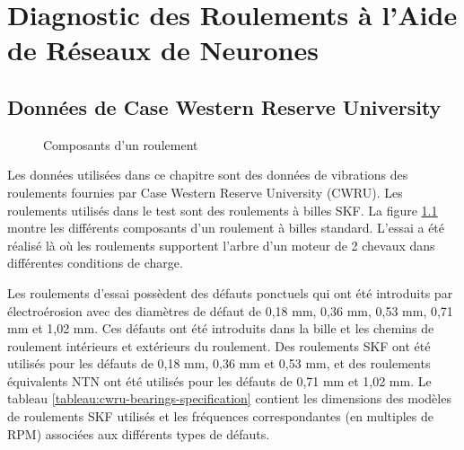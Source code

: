 \chapter{Diagnostic des Roulements à l'Aide de Réseaux de Neurones}


\section{Données de Case Western Reserve University}

\begin{figure}
    \centering
	
	\caption{Composants d'un roulement}
    \label{figure:skf-bearing-components}    
\end{figure}

Les données utilisées dans ce chapitre sont des données de vibrations des roulements fournies par Case Western Reserve University (CWRU). Les roulements utilisés dans le test sont des roulements à billes SKF. La figure \ref{figure:skf-bearing-components} montre les différents composants d'un roulement à billes standard. L'essai a été réalisé là où les roulements supportent l'arbre d'un moteur de 2 chevaux dans différentes conditions de charge. 

Les roulements d'essai possèdent des défauts ponctuels qui ont été introduits par électroérosion avec des diamètres de défaut de 0,18 mm, 0,36 mm, 0,53 mm, 0,71 mm et 1,02 mm. Ces défauts ont été introduits dans la bille et les chemins de roulement intérieurs et extérieurs du roulement. Des roulements SKF ont été utilisés pour les défauts de 0,18 mm, 0,36 mm et 0,53 mm, et des roulements équivalents NTN ont été utilisés pour les défauts de 0,71 mm et 1,02 mm. Le tableau \ref{tableau:cwru-bearings-specification} contient les dimensions des modèles de roulements SKF utilisés et les fréquences correspondantes (en multiples de RPM) associées aux différents types de défauts.

